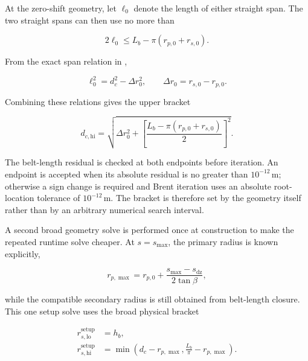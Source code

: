 \documentclass[11pt]{report}
\numberwithin{equation}{section}
\begin{document}
At the zero-shift geometry, let $\ell_0$ denote the length of either straight
span.  The two straight spans can then use no more than

\begin{equation}
    2\ell_0
    \leq
    L_b-\pi(r_{p,0}+r_{s,0}).
    \label{eq:appendix_maximum_straight_span_length}
\end{equation}

From the exact span relation in ,

\begin{equation}
    \ell_0^2=d_c^2-\Delta r_0^2,
    \qquad
    \Delta r_0=r_{s,0}-r_{p,0}.
    \label{eq:appendix_zero_shift_span_geometry}
\end{equation}

Combining these relations gives the upper bracket

\begin{equation}
    d_{c,\mathrm{hi}}
    =
    \sqrt{
        \Delta r_0^2
        +
        \left[
            \frac{L_b-\pi(r_{p,0}+r_{s,0})}{2}
        \right]^2
    }.
    \label{eq:appendix_center_distance_upper_bound}
\end{equation}

The belt-length residual is checked at both endpoints before iteration.  An
endpoint is accepted when its absolute residual is no greater than
$10^{-12}\,\mathrm{m}$; otherwise a sign change is required and Brent iteration
uses an absolute root-location tolerance of $10^{-12}\,\mathrm{m}$.  The
bracket is therefore set by the geometry itself rather than by an arbitrary
numerical search interval.

A second broad geometry solve is performed once at construction to make the
repeated runtime solve cheaper.  At $s=s_{\max}$, the primary radius is known
explicitly,

\begin{equation}
    r_{p,\max}
    =
    r_{p,0}
    +
    \frac{s_{\max}-s_{\mathrm{dz}}}{2\tan\beta},
    \label{eq:appendix_primary_radius_max_shift}
\end{equation}

while the compatible secondary radius is still obtained from belt-length
closure.  This one setup solve uses the broad physical bracket

\begin{equation}
\begin{aligned}
    r_{s,\mathrm{lo}}^{\mathrm{setup}} &= h_b,\\
    r_{s,\mathrm{hi}}^{\mathrm{setup}}
    &=
    \min\!\left(
        d_c-r_{p,\max},
        \frac{L_b}{\pi}-r_{p,\max}
    \right).
\end{aligned}
\label{eq:appendix_secondary_setup_bounds}
\end{equation}
\end{document}
